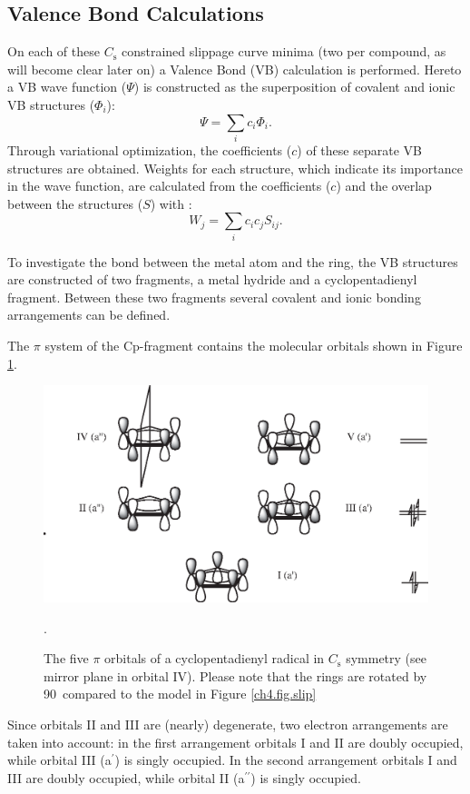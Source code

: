 \subsection{Valence Bond Calculations}

On each of these $C_\mathrm{s}$ constrained slippage curve minima (two per compound, as will become clear later on) a Valence Bond (VB) calculation is performed. Hereto a VB wave function ($\Psi$) is constructed as the superposition of covalent and ionic VB structures ($\Phi_i$):
\begin{equation}
\Psi = \sum_{i} c_{i}\Phi{_i}.
\label{ch4.eq.psi}
\end{equation}
Through variational optimization, the coefficients ($c$) of these separate VB structures are obtained.
Weights for each structure, which indicate its importance in the wave function, are calculated from the coefficients ($c$) and the overlap between the structures ($S$) with \cite{coulson}:
\begin{equation}
W_{j}=\sum_{i} c_{i}c_{j}S_{ij}.
\label{ch4.eq.weight}
\end{equation}

To investigate the bond between the metal atom and the ring, the VB structures are constructed of two fragments, a metal hydride and a cyclopentadienyl fragment.  Between these two fragments several covalent and ionic bonding arrangements can be defined.

The $\pi$ system of the Cp-fragment contains the molecular orbitals shown in Figure \ref{ch4.fig.cporbs}.
\begin{figure}[htbp]
\center
\includegraphics[scale=0.7]{cyclopentadienyl/figures/cp-orbitals.eps}
\caption{The five $\pi$ orbitals of a cyclopentadienyl radical in $C_\mathrm{s}$ symmetry (see mirror plane in orbital IV). Please note that the rings are rotated by 90\degrees\ compared to the model in Figure \ref{ch4.fig.slip}}.
\label{ch4.fig.cporbs}
\end{figure}
Since orbitals II and III are (nearly) degenerate, two electron arrangements are taken into account: in the first arrangement orbitals I and II are doubly occupied, while orbital III (a$^\prime$) is singly occupied. In the second arrangement orbitals I and III are doubly occupied, while orbital II (a$^{\prime\prime}$) is singly occupied. 

